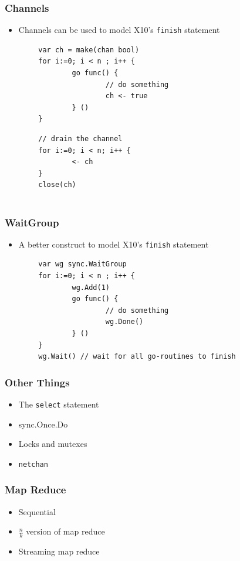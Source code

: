 \documentclass{beamer}
\begin{document}
\begin{frame}[fragile]
\frametitle{Channels}
\begin{itemize}
\item Channels can be used to model X10's \verb=finish= statement
\end{itemize}
\begin{verbatim}
        var ch = make(chan bool)
        for i:=0; i < n ; i++ {
                go func() { 
                        // do something
                        ch <- true
                } ()
        }
\end{verbatim}
\pause
\begin{verbatim}
        // drain the channel
        for i:=0; i < n; i++ {
                <- ch
        }
        close(ch)
        
\end{verbatim}
\end{frame}


\begin{frame} [fragile]
\frametitle{WaitGroup}
\begin{itemize}
\item A better construct to model X10's \verb=finish= statement
\end{itemize}
\begin{verbatim}
        var wg sync.WaitGroup
        for i:=0; i < n ; i++ {
                wg.Add(1)
                go func() { 
                        // do something
                        wg.Done()
                } ()                
        }
        wg.Wait() // wait for all go-routines to finish
\end{verbatim}
\end{frame}

\begin{frame} [fragile]
\frametitle{Other Things}
\begin{itemize}
\item The \verb=select= statement
\item sync.Once.Do
\item Locks and mutexes
\item \verb=netchan= 
\end{itemize}
\end{frame}


\begin{frame}[fragile] 
\frametitle{Map Reduce}
\begin{itemize}
  \item Sequential
  \item $\frac{n}{k}$ version of map reduce 
  \item Streaming map reduce 
\end{itemize}
\end{frame}
\end{document}
